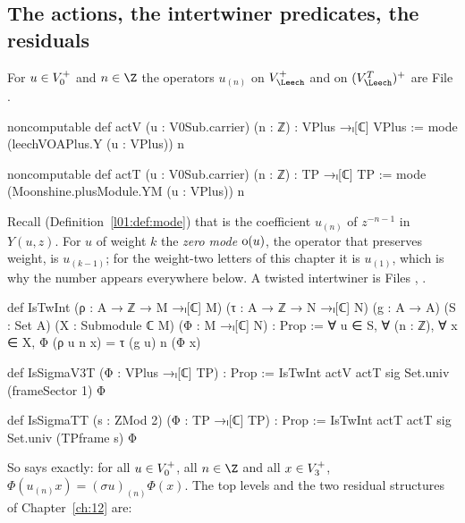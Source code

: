 \subsection{The actions, the intertwiner predicates, the residuals}
For $u\in V_0^{+}$ and $n\in\Z$ the operators $u_{(n)}$ on $V_\Leech^+$ and on $(V_\Leech^T)^+$ are
\noindent File .
\begin{leancode}
noncomputable def actV (u : V0Sub.carrier) (n : ℤ) : VPlus →ₗ[ℂ] VPlus :=
  mode (leechVOAPlus.Y (u : VPlus)) n

noncomputable def actT (u : V0Sub.carrier) (n : ℤ) : TP →ₗ[ℂ] TP :=
  mode (Moonshine.plusModule.YM (u : VPlus)) n
\end{leancode}
Recall (Definition~\ref{l01:def:mode}) that  is the coefficient $u_{(n)}$ of $z^{-n-1}$ in
$Y(u,z)$. For $u$ of weight $k$ the \emph{zero mode} $\operatorname{o}(u)$, the operator that preserves
weight, is $u_{(k-1)}$; for the weight-two letters of this chapter it is $u_{(1)}$, which is why the
number  appears everywhere below. A twisted intertwiner is
\noindent Files , .
\begin{leancode}
def IsTwInt (ρ : A → ℤ → M →ₗ[ℂ] M) (τ : A → ℤ → N →ₗ[ℂ] N) (g : A → A) (S : Set A)
    (X : Submodule ℂ M) (Φ : M →ₗ[ℂ] N) : Prop :=
  ∀ u ∈ S, ∀ (n : ℤ), ∀ x ∈ X, Φ (ρ u n x) = τ (g u) n (Φ x)

def IsSigmaV3T (Φ : VPlus →ₗ[ℂ] TP) : Prop :=
  IsTwInt actV actT sig Set.univ (frameSector 1) Φ

def IsSigmaTT (s : ZMod 2) (Φ : TP →ₗ[ℂ] TP) : Prop :=
  IsTwInt actT actT sig Set.univ (TPframe s) Φ
\end{leancode}
So  says exactly: for all $u\in V_0^{+}$, all $n\in\Z$ and all $x\in V_3^{+}$,
$\Phi(u_{(n)}x)=(\sigma u)_{(n)}\Phi(x)$. The top levels and the two residual structures of
Chapter~\ref{ch:12} are:
